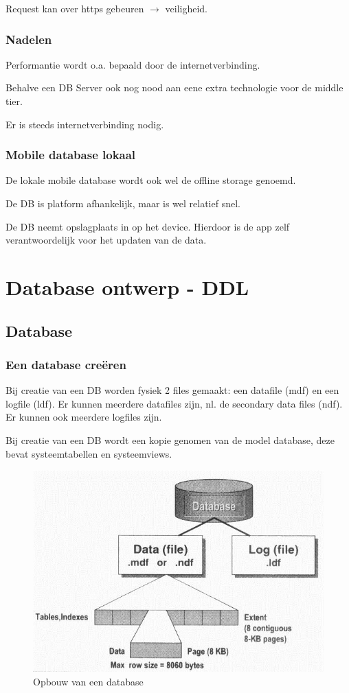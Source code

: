 \documentclass[a4paper,12pt]{article}
\begin{document}
Request kan over https gebeuren $\rightarrow$ veiligheid.

\subsubsection{Nadelen}
Performantie wordt o.a. bepaald door de internetverbinding.

Behalve een DB Server ook nog nood aan eene extra technologie voor de middle tier.

Er is steeds internetverbinding nodig.

\subsubsection{Mobile database lokaal}
De lokale mobile database wordt ook wel de offline storage genoemd.

De DB is platform afhankelijk, maar is wel relatief snel.

De DB neemt opslagplaats in op het device.
Hierdoor is de app zelf verantwoordelijk voor het updaten van de data.

\section{Database ontwerp - DDL}
\subsection{Database}
\subsubsection{Een database creëren}
Bij creatie van een DB worden fysiek 2 files gemaakt: een datafile (mdf) en een logfile (ldf).
Er kunnen meerdere datafiles zijn, nl. de secondary data files (ndf).
Er kunnen ook meerdere logfiles zijn.

Bij creatie van een DB wordt een kopie genomen van de model database, deze bevat systeemtabellen en systeemviews.

\begin{figure}[H]
\centering
  	\includegraphics[width=.5\linewidth]{img/DatabaseCreatie.png}
  	\caption{Opbouw van een database}
  	\label{fig:DatabaseCreatie}
\end{figure}
\end{document}
